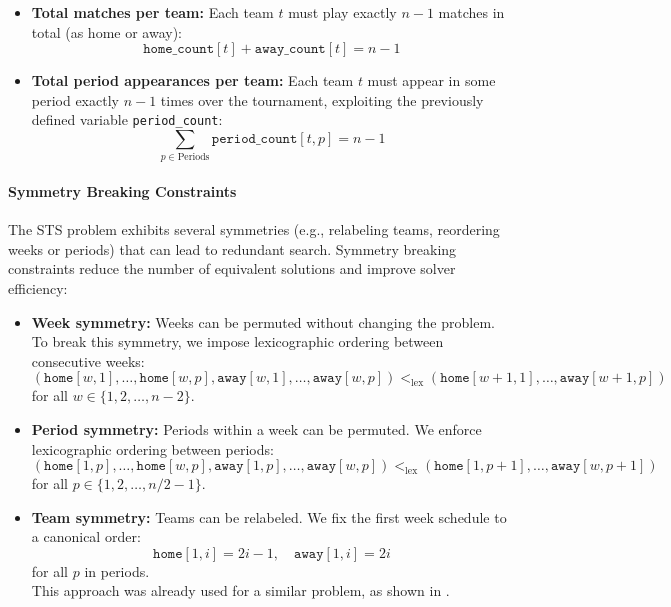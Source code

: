 \documentclass[11pt]{article}
\begin{document}
\begin{itemize}
    \item \textbf{Total matches per team:}  
    Each team $t$ must play exactly $n-1$ matches in total (as home or away):
    \begin{equation*}
        \texttt{home\_count}[t] + \texttt{away\_count}[t] = n - 1
    \end{equation*}

    \item \textbf{Total period appearances per team:}  
    Each team $t$ must appear in some period exactly $n - 1$ times over the tournament, exploiting the previously defined variable \texttt{period\_count}:
    \begin{equation*}
        \sum_{p \in \text{Periods}} \texttt{period\_count}[t, p] = n - 1
    \end{equation*}
\end{itemize}

\paragraph{Symmetry Breaking Constraints}

The STS problem exhibits several symmetries (e.g., relabeling teams, reordering weeks or periods) that can lead to redundant search. Symmetry breaking constraints reduce the number of equivalent solutions and improve solver efficiency:

\begin{itemize}
    \item \textbf{Week symmetry:}  
    Weeks can be permuted without changing the problem. To break this symmetry, we impose lexicographic ordering between consecutive weeks:
    \begin{equation*}
        (\texttt{home}[w,1], \ldots, \texttt{home}[w,p], \texttt{away}[w,1], \ldots, \texttt{away}[w,p]) <_{\text{lex}} (\texttt{home}[w+1,1], \ldots, \texttt{away}[w+1,p])
    \end{equation*}
    for all $w \in \{1, 2, \ldots, n-2\}$.

    \item \textbf{Period symmetry:}  
    Periods within a week can be permuted. We enforce lexicographic ordering between periods:
    \begin{equation*}
        (\texttt{home}[1,p], \ldots, \texttt{home}[w,p], \texttt{away}[1,p], \ldots, \texttt{away}[w,p]) <_{\text{lex}} (\texttt{home}[1,p+1], \ldots, \texttt{away}[w,p+1])
    \end{equation*}
    for all $p \in \{1, 2, \ldots, n/2-1\}$.

    \item \textbf{Team symmetry:}  
    Teams can be relabeled. We fix the first week schedule to a canonical order:
    \begin{equation*}
        \texttt{home}[1, i] = 2i - 1,\quad \texttt{away}[1, i] = 2i
    \end{equation*}
    for all $p$ in periods.
    \\
    This approach was already used for a similar problem, as shown in \cite{teamsymm}.
\end{itemize}
\end{document}
